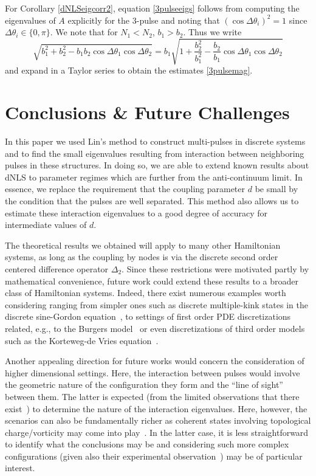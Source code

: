 \documentclass[12pt]{article}
\begin{document}
For Corollary \ref{dNLSeigcorr2}, equation \eqref{3pulseeigs} follows from computing the eigenvalues of $A$ explicitly for the 3-pulse and noting that $(\cos \Delta \theta_i)^2 = 1$ since $\Delta \theta_i \in \{0, \pi\}$. We note that for $N_1 < N_2$, $b_1 > b_2$. Thus we write
\[
\sqrt{b_1^2 + b_2^2 - b_1 b_2\cos\Delta\theta_1 \cos\Delta\theta_2} = b_1
\sqrt{1 + \frac{b_2^2}{b_1^2} - \frac{b_2}{b_1} \cos\Delta\theta_1 \cos\Delta\theta_2} 
\]
and expand in a Taylor series to obtain the estimates \eqref{3pulsemag}.

\section{Conclusions \& Future Challenges}

In this paper we used Lin's method to construct multi-pulses in discrete systems and to find the small eigenvalues resulting from interaction between neighboring pulses in these structures. In doing so, we are able to extend known results about dNLS to parameter regimes which are further from the anti-continuum limit. In essence, we replace the requirement that the coupling parameter $d$ be small by the condition that the pulses are well separated. This method also allows us to estimate these interaction eigenvalues to a good degree of accuracy for intermediate values of $d$.


The theoretical results we obtained will apply to many other Hamiltonian systems, as long as the coupling by nodes is via the discrete second order centered difference operator $\Delta_2$. Since these restrictions were motivated partly by mathematical convenience, future work could extend these results to a broader class of Hamiltonian systems. Indeed, there exist numerous 
examples worth considering ranging from simpler
ones such as discrete multiple-kink states in 
the discrete sine-Gordon equation~\cite{peyrard},
to settings of first order PDE discretizations
related, e.g., to the Burgers model~\cite{turner}
or even discretizations of third order models
such as the Korteweg-de Vries equation~\cite{ohta}. 

Another appealing direction for future works
would concern the consideration of higher dimensional
settings. Here, the interaction between pulses 
would involve the geometric nature of the configuration
they form and the ``line of sight'' between them.
The latter is expected (from the limited observations that
there exist~\cite{alanold}) to determine the nature
of the interaction eigenvalues. Here, however, the
scenarios can also be fundamentally richer as 
coherent states involving topological charge/vorticity
may come into play~\cite{Kevrekidis2009}. In the latter
case, it is less straightforward to identify what the
conclusions may be and considering such more complex
configurations (given also their experimental
observation~\cite{vo3a,vo3b}) may be of particular 
interest.



\end{document}
